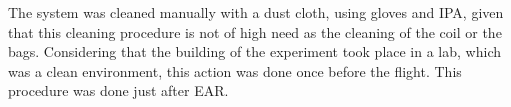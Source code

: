 The system was cleaned manually with a dust cloth, using gloves and IPA, given that this cleaning procedure is not of high need as the cleaning of the coil or the bags. Considering that the building of the experiment took place in a lab, which was a clean environment, this action was done once before the flight. This procedure was done just after EAR.


